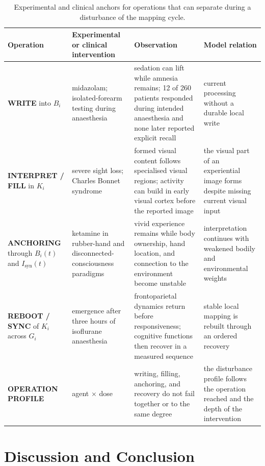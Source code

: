 \begin{table}[H]
\centering
\footnotesize
\renewcommand{\arraystretch}{0.98}
\begin{tabular}{@{}
>{\raggedright\arraybackslash}p{2.58cm}
>{\raggedright\arraybackslash}p{3.15cm}
>{\raggedright\arraybackslash}p{4.2cm}
>{\raggedright\arraybackslash}p{2.87cm}@{}}
\toprule
Operation & Experimental or clinical intervention & Observation & Model relation \\
\midrule
\textbf{WRITE} into $B_i$
& midazolam; isolated-forearm testing during anaesthesia
& sedation can lift while amnesia remains; 12 of 260 patients responded during intended anaesthesia and none later reported explicit recall
& current processing without a durable local write \citep{curran1991,sanders2017} \\[2pt]
\textbf{INTERPRET / FILL} in $K_i$
& severe sight loss; Charles Bonnet syndrome
& formed visual content follows specialised visual regions; activity can build in early visual cortex before the reported image
& the visual part of an experiential image forms despite missing current visual input \citep{ffytche1998,hahamy2021} \\[2pt]
\textbf{ANCHORING} through $B_i(t)$ and $I_{\mathrm{syn}}(t)$
& ketamine in rubber-hand and disconnected-consciousness paradigms
& vivid experience remains while body ownership, hand location, and connection to the environment become unstable
& interpretation continues with weakened bodily and environmental weights \citep{morgan2011,sarasso2015} \\[2pt]
\textbf{REBOOT / SYNC} of $K_i$ across $G_i$
& emergence after three hours of isoflurane anaesthesia
& frontoparietal dynamics return before responsiveness; cognitive functions then recover in a measured sequence
& stable local mapping is rebuilt through an ordered recovery \citep{mashour2021} \\[2pt]
\textbf{OPERATION PROFILE}
& agent $\times$ dose
& writing, filling, anchoring, and recovery do not fail together or to the same degree
& the disturbance profile follows the operation reached and the depth of the intervention \\
\bottomrule
\end{tabular}
\caption{Experimental and clinical anchors for operations that can separate during a disturbance
of the mapping cycle.}
\label{tab:operational_disruption}
\end{table}

\section{Discussion and Conclusion}
\label{sec:discussion}

